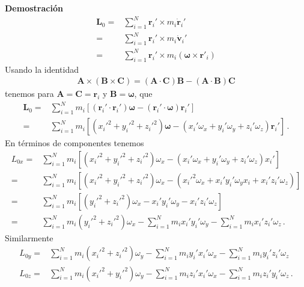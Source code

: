\noindent
\textbf{Demostración}
\begin{align*}
\mathbf{L}_0 =& \sum_{i=1}^N \mathbf{r}_i'\times
m_i\dot{\mathbf{r}}_i' \nonumber\\
=&  \sum_{i=1}^N \mathbf{r}_i'\times m_i\dot{\mathbf{v}}_i' \nonumber\\
=&  \sum_{i=1}^N \mathbf{r}_i'\times m_i (\boldsymbol{\omega}\times \mathbf{r}'_i)
\end{align*}
Usando la identidad
\begin{align*}
  \mathbf{A}\times\left(\mathbf{B}\times\mathbf{C}\right)=\left(\mathbf{A}\cdot\mathbf{C}\right)\mathbf{B}-\left(\mathbf{A}\cdot\mathbf{B}\right)\mathbf{C}
\end{align*}
tenemos para $\mathbf{A}=\mathbf{C}=\mathbf{r}_i$ y
$\mathbf{B}=\boldsymbol{\omega}$, que
\begin{align*}
  \mathbf{L}_0=&\sum_{i=1}^N m_i \left[ \left(\mathbf{r}_i'\cdot\mathbf{r}_i'
  \right)\boldsymbol{\omega}
  -\left( \mathbf{r}_i'\cdot\boldsymbol{\omega}\right)\mathbf{r}_i' \right] \nonumber\\
=&\sum_{i=1}^N m_i \left[\left( {x_i'}^2+{y_i'}^2+{z_i'}^2 \right)\boldsymbol{\omega}
-\left(x_{i}'\omega_x+y_{i}'\omega_y+z_{i}'\omega_z  \right)\mathbf{r}_i'\right]\,.
\end{align*}
En términos de componentes tenemos
\begin{align}
\label{eq:Lox}
 L_{0x}=&\sum_{i=1}^N m_i \left[  \left( {x_i'}^2+{y_i'}^2+{z_i'}^2 \right)\omega_x
-\left(x_{i}'\omega_x+y_{i}'\omega_y+z_{i}'\omega_z  \right) x_i'\right] \nonumber\\
=&\sum_{i=1}^N m_i \left[\left( {x_i'}^2+{y_i'}^2+{z_i'}^2 \right)\omega_x
-\left({x_i'}^2\omega_x+x_i'y_i'\omega_yx_i+x_i'z_i'\omega_z  \right)\right] \nonumber\\
=&\sum_{i=1}^N m_i \left[\left( {y_i'}^2+{z_i'}^2 \right)\omega_x
-x_i'y_i'\omega_y-x_i'z_i'\omega_z  \right] \nonumber\\
=&\sum_{i=1}^N m_i\left( {y_i'}^2+{z_i'}^2 \right)\omega_x
-\sum_{i=1}^N m_i x_i' y_i'\omega_y-\sum_{i=1}^N m_ix_i'z_i'\omega_z \,.
\end{align}
Similarmente
\begin{align}
\label{eq:Loyz}
  L_{0y}=&\sum_{i=1}^N m_i\left( {x_i'}^2+{z_i'}^2 \right)\omega_y
-\sum_{i=1}^N m_i y_i'x_i' \omega_x-\sum_{i=1}^N m_iy_i'z_i'\omega_z \nonumber\\
  L_{0z}=&\sum_{i=1}^N m_i\left( {x_i'}^2+{y_i'}^2 \right)\omega_y
-\sum_{i=1}^N m_i z_i'x_i' \omega_x-\sum_{i=1}^N m_iz_i'y_i'\omega_z \,.
\end{align}
